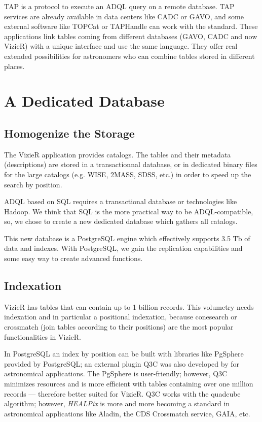 TAP \citep{tap_2011} is a protocol to execute an ADQL query on a remote database. TAP services are already available in data centers like CADC or GAVO, and some external software like TOPCat or TAPHandle can work with the standard. These applications link tables coming from different databases (GAVO, CADC and now VizieR) with a unique interface and use the same language. They offer real extended possibilities for astronomers who can combine tables stored in different places.


\section{A Dedicated Database}

\subsection{Homogenize the Storage}
The VizieR application provides catalogs. The tables and their metadata (descriptions) are stored in a transactionnal database, or in dedicated binary files for the large catalogs (e.g. WISE, 2MASS, SDSS, etc.) in order to speed up the search by position.

ADQL based on SQL requires a transactional database or technologies like Hadoop. We think that SQL is the more practical way to be ADQL-compatible, so, we chose to create a new dedicated database which gathers all catalogs. 

This new database is a PostgreSQL engine which effectively supports 3.5 Tb of data and indexes. With PostgreSQL, we gain the replication capabilities and some easy way to create advanced functions.

\subsection{Indexation}
VizieR has tables that can contain up to 1 billion records. This volumetry needs indexation and in particular a positional indexation, because conesearch or crossmatch (join tables according to their positions) are the most popular functionalities in VizieR.

In PostgreSQL an index by position can be built with libraries like PgSphere provided by PostgreSQL; an external plugin Q3C was also developed by \citet{q3c_2006} for astronomical applications. The PgSphere is user-friendly; however, Q3C minimizes resources and is more efficient with tables containing over one million records --- therefore better suited for VizieR. Q3C works with the quadcube algorithm; however, {\em HEALPix} is more and more becoming a standard in astronomical applications like Aladin, the CDS Crossmatch service, GAIA, etc.


